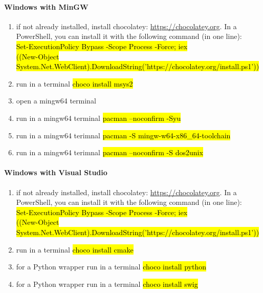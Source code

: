 \documentclass{book}
\begin{document}
\paragraph{Windows with MinGW}
\begin{enumerate}
    \item if not already installed, install chocolatey: \url{https://chocolatey.org}. In a PowerShell, you can install it with the following command (in one line): \\ \hl{Set-ExecutionPolicy Bypass -Scope Process -Force; iex \\ ((New-Object System.Net.WebClient).DownloadString('https://chocolatey.org/install.ps1'))}
    \item run in a terminal \hl{choco install msys2}
    \item open a mingw64 terminal
    \item run in a mingw64 terminal \hl{pacman --noconfirm -Syu}
    \item run in a mingw64 terimnal \hl{pacman -S mingw-w64-x86\_64-toolchain}
    \item run in a mingw64 terimnal \hl{pacman --noconfirm -S dos2unix}
\end{enumerate}
\paragraph{Windows with Visual Studio}
\begin{enumerate}
    \item if not already installed, install chocolatey: \url{https://chocolatey.org}. In a PowerShell, you can install it with the following command (in one line): \\ \hl{Set-ExecutionPolicy Bypass -Scope Process -Force; iex \\ ((New-Object System.Net.WebClient).DownloadString('https://chocolatey.org/install.ps1'))}
    \item run in a terminal \hl{choco install cmake} 
    \item for a Python wrapper run in a terminal \hl{choco install python} 
    \item for a Python wrapper run in a terminal \hl{choco install swig} 
\end{enumerate}
\end{document}
